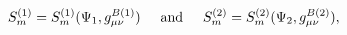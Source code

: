 \begin{equation}
S_m^{(1)} = S_m^{(1)}(\Psi_1,g^{B(1)}_{\mu\nu}) \hspace{0.5cm} {\rm and}
\hspace{0.5cm} S_m^{(2)} = S_m^{(2)}(\Psi_2,g^{B(2)}_{\mu\nu}),
\end{equation}

